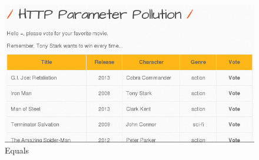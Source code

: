 \documentclass{article}
\begin{document}
\begin{figure}
    \centering
    \includegraphics[width=1\linewidth]{Figures/httppp/http_oopsieagain.png}
    \caption{\label{fig:httppp-2}Equals}
\end{figure}
\end{document}

